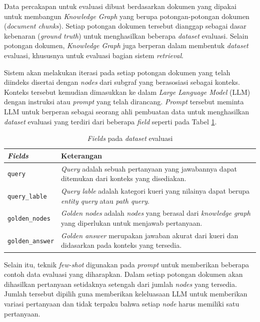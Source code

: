 Data percakapan untuk evaluasi dibuat berdasarkan dokumen yang dipakai untuk membangun \textit{Knowledge Graph} yang berupa potongan-potongan dokumen (\textit{document chunks}).
Setiap potongan dokumen tersebut dianggap sebagai dasar kebenaran (\textit{ground truth}) untuk menghasilkan beberapa \textit{dataset} evaluasi.
Selain potongan dokumen, \textit{Knowledge Graph} juga berperan dalam membentuk \textit{dataset} evaluasi, khususnya untuk evaluasi bagian sistem \textit{retrieval}.

Sistem akan melakukan iterasi pada setiap potongan dokumen yang telah diindeks disertai dengan \textit{nodes} dari subgraf yang berasosiasi sebagai konteks.
Konteks tersebut kemudian dimasukkan ke dalam \textit{Large Language Model} (LLM) dengan instruksi atau \textit{prompt} yang telah dirancang.
\textit{Prompt} tersebut meminta LLM untuk berperan sebagai seorang ahli pembuatan data untuk menghasilkan \textit{dataset} evaluasi yang terdiri dari beberapa \textit{field} seperti pada Tabel \ref{tab:evaluation-dataset-fields}.

\begin{table}[h]
	\centering
	\caption{\textit{Fields} pada \textit{dataset} evaluasi}
	\label{tab:evaluation-dataset-fields}
	\begin{tabular}{|p{}|p{}|}
		\hline
		\textbf{\textit{Fields}} & \textbf{Keterangan}                                                                                    \\
		\hline
		\texttt{query}           &
		\textit{Query} adalah sebuah pertanyaan yang jawabannya dapat ditemukan dari konteks yang disediakan.                             \\
		\hline
		\texttt{query\_lable}    &
		\textit{Query lable} adalah kategori kueri yang nilainya dapat berupa \textit{entity query} atau \textit{path query}.             \\
		\hline
		\texttt{golden\_nodes}   &
		\textit{Golden nodes} adalah \textit{nodes} yang berasal dari \textit{knowledge graph} yang diperlukan untuk menjawab pertanyaan. \\
		\hline
		\texttt{golden\_answer}  &
		\textit{Golden answer} merupakan jawaban akurat dari kueri dan didasarkan pada konteks yang tersedia.                             \\
		\hline
	\end{tabular}
\end{table}

Selain itu, teknik \textit{few-shot} digunakan pada \textit{prompt} untuk memberikan beberapa contoh data evaluasi yang diharapkan.
Dalam setiap potongan dokumen akan dihasilkan pertanyaan setidaknya setengah dari jumlah \textit{nodes} yang tersedia.
Jumlah tersebut dipilih guna memberikan keleluasaan LLM untuk memberikan variasi pertanyaan dan tidak terpaku bahwa setiap \textit{node} harus memiliki satu pertanyaan.

